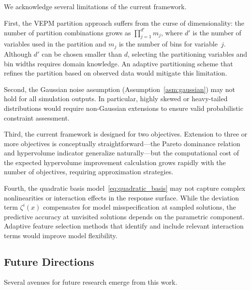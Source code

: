 \documentclass[12pt]{article}
\theoremstyle{plain}
\theoremstyle{definition}
\theoremstyle{remark}
\begin{document}
We acknowledge several limitations of the current framework.

First, the VEPM partition approach suffers from the curse of
dimensionality: the number of partition combinations grows as
$\prod_{j=1}^{d'}m_{j}$, where $d'$ is the number of variables used in
the partition and $m_{j}$ is the number of bins for variable~$j$.
Although $d'$ can be chosen smaller than $d$, selecting the partitioning
variables and bin widths requires domain knowledge.  An adaptive
partitioning scheme that refines the partition based on observed data
would mitigate this limitation.

Second, the Gaussian noise assumption
(Assumption~\ref{asm:gaussian}) may not hold for all simulation outputs.
In particular, highly skewed or heavy-tailed distributions would require
non-Gaussian extensions to ensure valid probabilistic constraint
assessment.

Third, the current framework is designed for two objectives.  Extension
to three or more objectives is conceptually straightforward---the Pareto
dominance relation and hypervolume indicator generalize naturally---but
the computational cost of the expected hypervolume improvement
calculation grows rapidly with the number of objectives, requiring
approximation strategies.

Fourth, the quadratic basis model~\eqref{eq:quadratic_basis} may not
capture complex nonlinearities or interaction effects in the response
surface.  While the deviation term $\zeta^{i}(x)$ compensates for model
misspecification at sampled solutions, the predictive accuracy at
unvisited solutions depends on the parametric component.  Adaptive
feature selection methods that identify and include relevant interaction
terms would improve model flexibility.


\subsection{Future Directions}\label{subsec:future}

Several avenues for future research emerge from this work.
\end{document}
